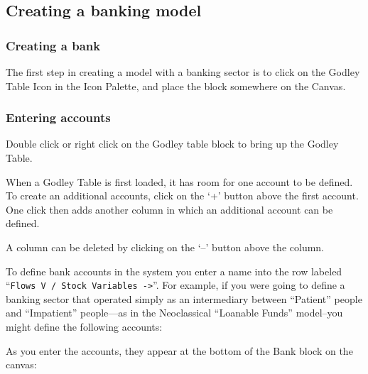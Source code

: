 \subsection{Creating a banking model}
\label{creatingBankingModel}

\subsubsection{Creating a bank}

The first step in creating a model with a banking sector is to click on the Godley Table Icon in the Icon Palette, and place the block somewhere on the Canvas.

\subsubsection{Entering accounts}

Double click or right click on the Godley table block
to bring up the Godley Table.

When a Godley Table is first loaded, it has room for one account to be
defined. To create an additional accounts, click on the
`+' button above the first account. One
click then adds another column in which an additional account can be
defined.

\begin{center}
\end{center}


A column can be deleted by clicking on the `--' button above the column.

To define bank accounts in the system you enter a name into the row
labeled ``\verb+Flows V / Stock Variables ->+''. For example, if you were
going to define a banking sector that operated simply as an
intermediary between ``Patient'' people and ``Impatient'' people---as
in the Neoclassical ``Loanable Funds'' model--you might define the
following accounts: 

\begin{center}
\end{center}

As you enter the accounts, they appear at the bottom of the Bank block on the canvas:

